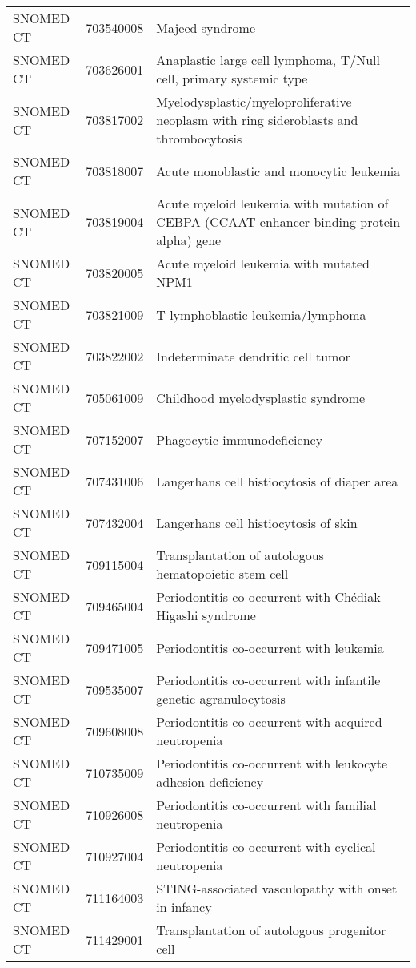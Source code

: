 \begin{longtable}{p{}p{}p{}}
  SNOMED CT & 703540008 & Majeed syndrome \\ 
  SNOMED CT & 703626001 & Anaplastic large cell lymphoma, T/Null cell, primary systemic type \\ 
  SNOMED CT & 703817002 & Myelodysplastic/myeloproliferative neoplasm with ring sideroblasts and thrombocytosis \\ 
  SNOMED CT & 703818007 & Acute monoblastic and monocytic leukemia \\ 
  SNOMED CT & 703819004 & Acute myeloid leukemia with mutation of CEBPA (CCAAT enhancer binding protein alpha) gene \\ 
  SNOMED CT & 703820005 & Acute myeloid leukemia with mutated NPM1 \\ 
  SNOMED CT & 703821009 & T lymphoblastic leukemia/lymphoma \\ 
  SNOMED CT & 703822002 & Indeterminate dendritic cell tumor \\ 
  SNOMED CT & 705061009 & Childhood myelodysplastic syndrome \\ 
  SNOMED CT & 707152007 & Phagocytic immunodeficiency \\ 
  SNOMED CT & 707431006 & Langerhans cell histiocytosis of diaper area \\ 
  SNOMED CT & 707432004 & Langerhans cell histiocytosis of skin \\ 
  SNOMED CT & 709115004 & Transplantation of autologous hematopoietic stem cell \\ 
  SNOMED CT & 709465004 & Periodontitis co-occurrent with Chédiak-Higashi syndrome \\ 
  SNOMED CT & 709471005 & Periodontitis co-occurrent with leukemia \\ 
  SNOMED CT & 709535007 & Periodontitis co-occurrent with infantile genetic agranulocytosis \\ 
  SNOMED CT & 709608008 & Periodontitis co-occurrent with acquired neutropenia \\ 
  SNOMED CT & 710735009 & Periodontitis co-occurrent with leukocyte adhesion deficiency \\ 
  SNOMED CT & 710926008 & Periodontitis co-occurrent with familial neutropenia \\ 
  SNOMED CT & 710927004 & Periodontitis co-occurrent with cyclical neutropenia \\ 
  SNOMED CT & 711164003 & STING-associated vasculopathy with onset in infancy \\ 
  SNOMED CT & 711429001 & Transplantation of autologous progenitor cell \\ 

\end{longtable}
